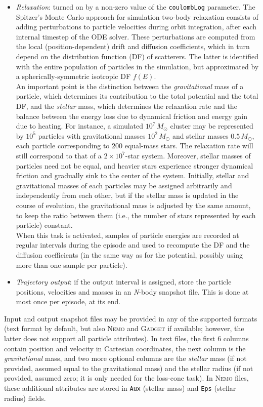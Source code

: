 \documentclass[12pt]{article}
\newcommand{\Nbody}{\textsl{N}-body\xspace}
\newcommand{\Nemo}{\textsc{Nemo}\xspace}
\begin{document}
\begin{itemize}
\item \textsl{Relaxation}: turned on by a non-zero value of the \texttt{coulombLog} parameter. The Spitzer's Monte Carlo approach for simulation two-body relaxation consists of adding perturbations to particle velocities during orbit integration, after each internal timestep of the ODE solver. These perturbations are computed from the local (position-dependent) drift and diffusion coefficients, which in turn depend on the distribution function (DF) of scatterers. The latter is identified with the entire population of particles in the simulation, but approximated by a spherically-symmetric isotropic DF $f(E)$. \\
An important point is the distinction between the \textit{gravitational} mass of a particle, which determines its contribution to the total potential and the total DF, and the \textit{stellar} mass, which determines the relaxation rate and the balance between the energy loss due to dynamical friction and energy gain due to heating. For instance, a simulated $10^7\,M_\odot$ cluster may be represented by $10^5$ particles with gravitational masses $10^2\,M_\odot$ and stellar masses $0.5\,M_\odot$, each particle corresponding to $200$ equal-mass stars. The relaxation rate will still correspond to that of a $2\times10^7$-star system. Moreover, stellar masses of particles need not be equal, and heavier stars experience stronger dynamical friction and gradually sink to the center of the system. Initially, stellar and gravitational masses of each particles may be assigned arbitrarily and independently from each other, but if the stellar mass is updated in the course of evolution, the gravitational mass is adjusted by the same amount, to keep the ratio between them (i.e., the number of stars represented by each particle) constant. \\
When this task is activated, samples of particle energies are recorded at regular intervals during the episode and used to recompute the DF and the diffusion coefficients (in the same way as for the potential, possibly using more than one sample per particle).
\item \textsl{Trajectory output}: if the output interval is assigned, store the particle positions, velocities and masses in an \Nbody snapshot file. This is done at most once per episode, at its end.
\end{itemize}

Input and output snapshot files may be provided in any of the supported formats (text format by default, but also \Nemo and \textsc{Gadget} if available; however, the latter does not support all particle attributes).
In text files, the first 6 columns contain position and velocity in Cartesian coordinates, the next column is the \textit{gravitational} mass, and two more optional columns are the \textit{stellar} mass (if not provided, assumed equal to the gravitational mass) and the stellar radius (if not provided, assumed zero; it is only needed for the loss-cone task). In \Nemo files, these additional attributes are stored in \texttt{Aux} (stellar mass) and \texttt{Eps} (stellar radius) fields.
\end{document}
